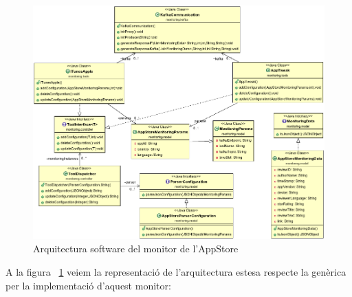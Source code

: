\begin{figure}
\centering
\includegraphics[width=14cm]{Figures/appstore}
\decoRule
\caption[Arquitectura software del monitor de l'AppStore]{Arquitectura software del monitor de l'AppStore}
\label{fig:appstore}
\end{figure}

A la figura ~\ref{fig:appstore} veiem la representació de l'arquitectura estesa respecte la genèrica per la implementació d'aquest monitor:

